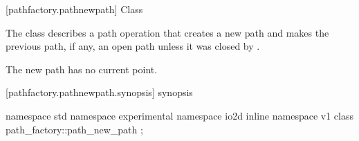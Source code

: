  [pathfactory.pathnewpath] {Class }

\pnum
{}
The class  describes a path operation that creates a new path and makes the previous path, if any, an open path unless it was closed by .

\pnum
The new path has no current point.

 [pathfactory.pathnewpath.synopsis] { synopsis}

\begin{codeblock}
namespace std { namespace experimental { namespace io2d { inline namespace v1 {
  class path_factory::path_new_path {
  };
} } } }
\end{codeblock}
